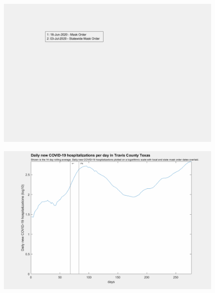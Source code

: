 \documentclass[]{article}
\begin{document}
\begin{figure}[!h]
	\includegraphics[width=\linewidth]{legends/travis_mask_order_legend.png}
	\caption{}
	\label{fig:legends/travis_mask_order_legendLabel}
\end{figure}

\begin{figure}[!h]
	\includegraphics[width=\linewidth]{images/travis_mask_order_hospitalizations_log.png}
	\caption{}
	\label{fig:images/travis_mask_order_hospitalizations_logLabel}
\end{figure}
\end{document}
